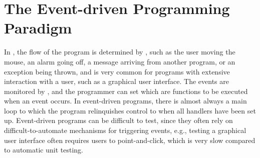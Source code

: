 \chapter{The Event-driven Programming Paradigm}
\label{chap:eventDriven}

In , the flow of the program is determined by , such as the user moving the mouse, an alarm going off, a message arriving from another program, or an exception being thrown, and is very common for programs with extensive interaction with a user, such as a graphical user interface. The events are monitored by , and the programmer can set  which are  functions to be executed when an event occurs. In event-driven programs, there is almost always a main loop to which the program relinquishes control to when all handlers have been set up. Event-driven programs can be difficult to test, since they often rely on difficult-to-automate mechanisms for triggering events, e.g., testing a graphical user interface often requires users to point-and-click, which is very slow compared to automatic unit testing.

